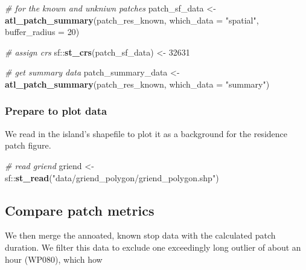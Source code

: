 \documentclass[
]{scrartcl}
\newenvironment{Shaded}{}{}
\newcommand{\CommentTok}[1]{\textcolor[rgb]{0.38,0.63,0.69}{\textit{#1}}}
\newcommand{\DataTypeTok}[1]{\textcolor[rgb]{0.56,0.13,0.00}{#1}}
\newcommand{\DecValTok}[1]{\textcolor[rgb]{0.25,0.63,0.44}{#1}}
\newcommand{\KeywordTok}[1]{\textcolor[rgb]{0.00,0.44,0.13}{\textbf{#1}}}
\newcommand{\NormalTok}[1]{#1}
\newcommand{\OperatorTok}[1]{\textcolor[rgb]{0.40,0.40,0.40}{#1}}
\newcommand{\StringTok}[1]{\textcolor[rgb]{0.25,0.44,0.63}{#1}}
\begin{document}
\begin{Shaded}
\begin{Highlighting}[]
\CommentTok{\# for the known and unkniwn patches}
\NormalTok{patch\_sf\_data <{-}}\StringTok{ }\KeywordTok{atl\_patch\_summary}\NormalTok{(patch\_res\_known, }
                                   \DataTypeTok{which\_data =} \StringTok{"spatial"}\NormalTok{,}
                                   \DataTypeTok{buffer\_radius =} \DecValTok{20}\NormalTok{)}

\CommentTok{\# assign crs}
\NormalTok{sf}\OperatorTok{::}\KeywordTok{st\_crs}\NormalTok{(patch\_sf\_data) <{-}}\StringTok{ }\DecValTok{32631}

\CommentTok{\# get summary data}
\NormalTok{patch\_summary\_data <{-}}\StringTok{ }\KeywordTok{atl\_patch\_summary}\NormalTok{(patch\_res\_known, }
                                        \DataTypeTok{which\_data =} \StringTok{"summary"}\NormalTok{)}
\end{Highlighting}
\end{Shaded}

\hypertarget{prepare-to-plot-data}{%
\subsubsection{Prepare to plot data}\label{prepare-to-plot-data}}

We read in the island's shapefile to plot it as a background for the residence patch figure.

\begin{Shaded}
\begin{Highlighting}[]
\CommentTok{\# read griend}
\NormalTok{griend <{-}}\StringTok{ }\NormalTok{sf}\OperatorTok{::}\KeywordTok{st\_read}\NormalTok{(}\StringTok{"data/griend\_polygon/griend\_polygon.shp"}\NormalTok{)}
\end{Highlighting}
\end{Shaded}

\hypertarget{compare-patch-metrics}{%
\subsection{Compare patch metrics}\label{compare-patch-metrics}}

We then merge the annoated, known stop data with the calculated patch duration.
We filter this data to exclude one exceedingly long outlier of about an hour (WP080), which how
\end{document}
